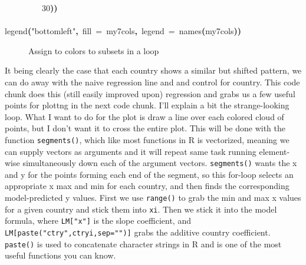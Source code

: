 \documentclass[a4paper]{article}
\newcommand{\hlnumber}[1]{\textcolor[rgb]{0.0823529411764706,0.0784313725490196,0.709803921568627}{#1}}%
\newcommand{\hlfunctioncall}[1]{\textcolor[rgb]{1,0,0}{#1}}%
\newcommand{\hlstring}[1]{\textcolor[rgb]{0.6,0.6,1}{#1}}%
\newcommand{\hlkeyword}[1]{\textcolor[rgb]{0,0,0}{\textbf{#1}}}%
\newcommand{\hlargument}[1]{\textcolor[rgb]{0.694117647058824,0.247058823529412,0.0196078431372549}{#1}}%
\newcommand{\hlsymbol}[1]{\textcolor[rgb]{0,0,0}{#1}}%
\newcommand{\hlprompt}[1]{\textcolor[rgb]{0,0,0}{#1}}%
\newcommand{\hlstd}[1]{\textcolor[rgb]{0,0,0}{#1}}%
\newenvironment{Houtput}{\raggedright}{%
%
}
\begin{document}
\begin{Houtput}
\hlstd{}\hlprompt{{\ }}{\ }{\ }{\ }{\ }{\ }{\ }{\ }{\ }\hlnumber{30}\hlkeyword{)}\hlkeyword{)}\hspace*{\fill}\\
\hlstd{}\hlprompt{{\ }}\hlkeyword{\usebox{\hlnormalsizeboxclosebrace}}\mbox{}
\normalfont
\hspace*{\fill}\\
\hlstd{}\ttfamily\noindent
\hlprompt{\usebox{\hlnormalsizeboxgreaterthan}{\ }}\hlfunctioncall{legend}\hlkeyword{(}\hlstring{"bottomleft"}\hlkeyword{,}{\ }\hlargument{fill}{\ }\hlargument{=}{\ }\hlsymbol{my7cols}\hlkeyword{,}{\ }\hlargument{legend}{\ }\hlargument{=}{\ }\hlfunctioncall{names}\hlkeyword{(}\hlsymbol{my7cols}\hlkeyword{)}\hlkeyword{)}\mbox{}
\normalfont
\hspace*{\fill}\\
\hlstd{}
\end{Houtput}

\begin{figure}[H]
\centering

{\tikzexternaldisable

}
\caption{Assign to colors to subsets in a loop}
\end{figure}

It being clearly the case that each country shows a similar but shifted pattern, we can do away with the naive regression line and and control for country. This code chunk does this (still easily improved upon) regression and grabs us a few useful points for plottng in the next code chunk. I'll explain a bit the strange-looking loop. What I want to do for the plot is draw a line over each colored cloud of points, but I don't want it to cross the entire plot. This will be done with the function \texttt{segments()}, which like most functions in R is vectorized, meaning we can supply vectors as arguments and it will repeat same task running element-wise simultaneously down each of the argument vectors. \texttt{segments()} wants the x and y for the points forming each end of the segment, so this for-loop selects an appropriate x max and min for each country, and then finds the corresponding model-predicted y values. First we use \texttt{range()} to grab the min and max x values for a given country and stick them into \texttt{xi}. Then we stick it into the model formula, where \texttt{LM["x"]} is the slope coefficient, and \texttt{LM[paste("ctry",ctryi,sep="")]} grabs the additive country coefficient. \texttt{paste()} is used to concatenate character strings in R and is one of the most useful functions you can know.
\end{document}
